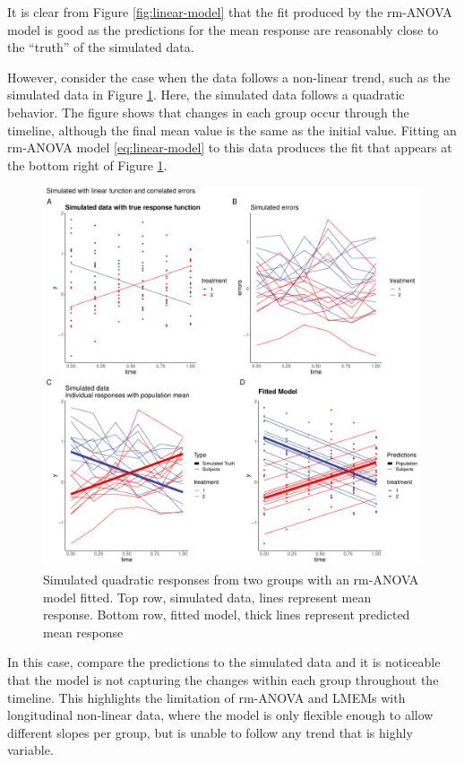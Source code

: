 \documentclass[
]{article}
\begin{document}
It is clear from Figure \ref{fig:linear-model} that the fit produced by the rm-ANOVA model is good as the predictions for the mean response are reasonably close to the ``truth'' of the simulated data.

However, consider the case when the data follows a non-linear trend, such as the simulated data in Figure \ref{fig:quadratic-response}. Here, the simulated data follows a quadratic behavior. The figure shows that changes in each group occur through the timeline, although the final mean value is the same as the initial value. Fitting an rm-ANOVA model \eqref{eq:linear-model} to this data produces the fit that appears at the bottom right of Figure \ref{fig:quadratic-response}.

\begin{figure}
\centering
\includegraphics{Manuscript_AM_v2_files/figure-latex/quadratic-response-1.pdf}
\caption{\label{fig:quadratic-response}Simulated quadratic responses from two groups with an rm-ANOVA model fitted. Top row, simulated data, lines represent mean response. Bottom row, fitted model, thick lines represent predicted mean response}
\end{figure}

In this case, compare the predictions to the simulated data and it is noticeable that the model is not capturing the changes within each group throughout the timeline. This highlights the limitation of rm-ANOVA and LMEMs with longitudinal non-linear data, where the model is only flexible enough to allow different slopes per group, but is unable to follow any trend that is highly variable.
\end{document}
